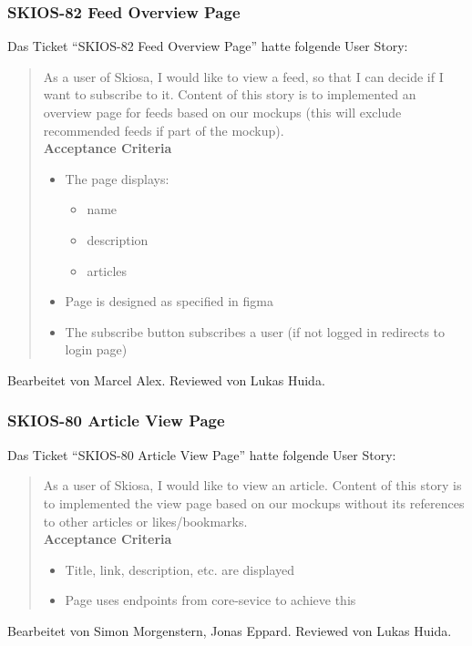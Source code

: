 \subsubsection{SKIOS-82 Feed Overview Page}
Das Ticket \enquote{SKIOS-82 Feed Overview Page} hatte folgende User Story:
\begin{quotation}
    As a user of Skiosa, I would like to view a feed, so that I can decide if I want to subscribe to it.
    Content of this story is to implemented an overview page for feeds based on our mockups (this will exclude recommended feeds if part of the mockup). \\
\textbf{Acceptance Criteria}
\begin{itemize}
    \item The page displays: 
    \begin{itemize}
        \item name
        \item description
        \item articles
    \end{itemize}
    \item Page is designed as specified in figma
    \item The subscribe button subscribes a user (if not logged in redirects to login page)
\end{itemize}
\end{quotation}
Bearbeitet von Marcel Alex.
Reviewed von Lukas Huida.

\subsubsection{SKIOS-80 Article View Page}
Das Ticket \enquote{SKIOS-80 Article View Page} hatte folgende User Story:
\begin{quotation}
    As a user of Skiosa, I would like to view an article.
    Content of this story is to implemented the view page based on our mockups without its references to other articles or likes/bookmarks. \\
\textbf{Acceptance Criteria}
\begin{itemize}
    \item Title, link, description, etc. are displayed 
    \item Page uses endpoints from core-sevice to achieve this
\end{itemize}
\end{quotation}
Bearbeitet von Simon Morgenstern, Jonas Eppard.
Reviewed von Lukas Huida.

